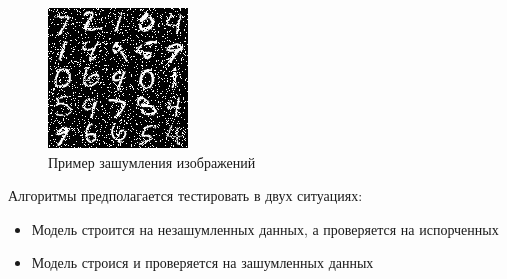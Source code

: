 \documentclass{article}
\begin{document}
\begin{figure}[h]
\begin{minipage}{.3\textwidth}
\end{minipage}
\begin{minipage}{.3\textwidth}
	\centering
	\includegraphics[width=\textwidth]{graphics/digits_spoiled20percent.jpg}
\end{minipage}
\caption{Пример зашумления изображений}
\end{figure}
Алгоритмы предполагается тестировать в двух ситуациях:
\begin{itemize}
\item Модель строится на незашумленных данных, а проверяется на испорченных
\item Модель строися и проверяется на зашумленных данных
\end{itemize}

\newpage
\end{document}
